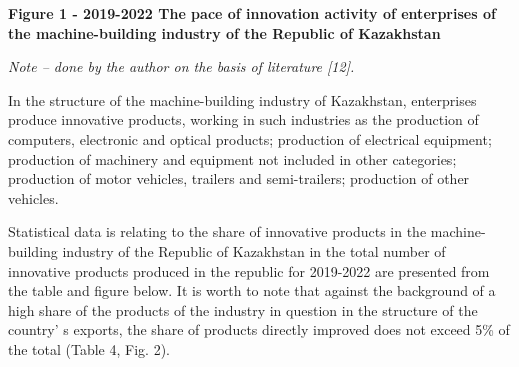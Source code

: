 {\bfseries Figure 1 - 2019-2022 The pace of innovation activity of enterprises of the machine-building industry of the Republic of Kazakhstan}

\emph{Note -- done by the author on the basis of literature {[}12{]}.}

\begin{multicols}{2}
In the structure of the machine-building industry of Kazakhstan,
enterprises produce innovative products, working in such industries as
the production of computers, electronic and optical products; production
of electrical equipment; production of machinery and equipment not
included in other categories; production of motor vehicles, trailers and
semi-trailers; production of other vehicles.

Statistical data is relating to the share of innovative products in the
machine-building industry of the Republic of Kazakhstan in the total
number of innovative products produced in the republic for 2019-2022 are
presented from the table and figure below. It is worth to note that
against the background of a high share of the products of the industry
in question in the structure of the country' s exports,
the share of products directly improved does not exceed 5\% of the total
(Table 4, Fig. 2).
\end{multicols}

